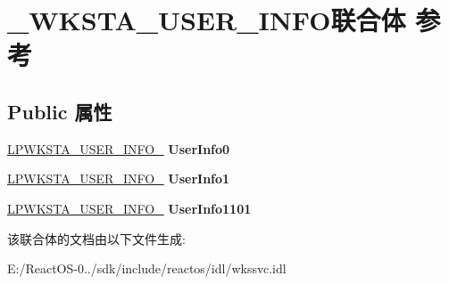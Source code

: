 \hypertarget{union___w_k_s_t_a___u_s_e_r___i_n_f_o}{}\section{\+\_\+\+W\+K\+S\+T\+A\+\_\+\+U\+S\+E\+R\+\_\+\+I\+N\+F\+O联合体 参考}
\label{union___w_k_s_t_a___u_s_e_r___i_n_f_o}
\subsection*{Public 属性}
\begin{DoxyCompactItemize}
\item 
\mbox{\label{union___w_k_s_t_a___u_s_e_r___i_n_f_o_a5d56e61b1b6f37b7444061a06d415f7e}} 
\hyperlink{struct___w_k_s_t_a___u_s_e_r___i_n_f_o__0}{L\+P\+W\+K\+S\+T\+A\+\_\+\+U\+S\+E\+R\+\_\+\+I\+N\+F\+O\+\_} {\bfseries User\+Info0}
\item 
\mbox{\label{union___w_k_s_t_a___u_s_e_r___i_n_f_o_ad78342d4fc4ba63adcd619af1245c0b7}} 
\hyperlink{struct___w_k_s_t_a___u_s_e_r___i_n_f_o__1}{L\+P\+W\+K\+S\+T\+A\+\_\+\+U\+S\+E\+R\+\_\+\+I\+N\+F\+O\+\_} {\bfseries User\+Info1}
\item 
\mbox{\label{union___w_k_s_t_a___u_s_e_r___i_n_f_o_a013a77e339dc21a4f3b5fa5d183937e1}} 
\hyperlink{struct___w_k_s_t_a___u_s_e_r___i_n_f_o__1101}{L\+P\+W\+K\+S\+T\+A\+\_\+\+U\+S\+E\+R\+\_\+\+I\+N\+F\+O\+\_} {\bfseries User\+Info1101}
\end{DoxyCompactItemize}


该联合体的文档由以下文件生成\+:\begin{DoxyCompactItemize}
\item 
E\+:/\+React\+O\+S-\/0../sdk/include/reactos/idl/wkssvc.\+idl\end{DoxyCompactItemize}
